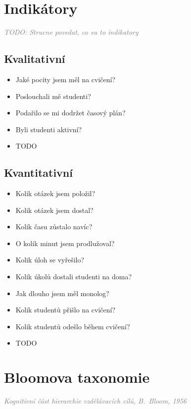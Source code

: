 \documentclass[twoside,openany,10pt]{book}
\newcommand{\note}[1]{\textcolor{gray}{\small\itshape #1}}
\begin{document}
\chapter*{Indikátory}
\label{indikatory}
\vspace{-0.5em}
\note{TODO: Strucne povedat, co su to indikatory}

\section*{Kvalitativní}
\begin{itemize}
\item Jaké pocity jsem měl na cvičení?
\item Poslouchali mě studenti?
\item Podařilo se mi dodržet časový plán?
\item Byli studenti aktivní?
\item TODO
\end{itemize}

\section*{Kvantitativní}
\begin{itemize}
\item Kolik otázek jsem položil?
\item Kolik otázek jsem dostal?
\item Kolik času zůstalo navíc?
\item O kolik minut jsem prodlužoval?
\item Kolik úloh se vyřešilo?
\item Kolik úkolů dostali studenti na doma?
\item Jak dlouho jsem měl monolog?
\item Kolik studentů přišlo na cvičení?
\item Kolik studentů odešlo během cvičení?
\item TODO
\end{itemize}
\newpage

\chapter*{Bloomova taxonomie}
\label{bloom}
\vspace{-0.5em}
\note{Kognitivní část hierarchie vzdělávacích cílů, B.\ Bloom, 1956}
\vspace{-0.3em}
\end{document}
